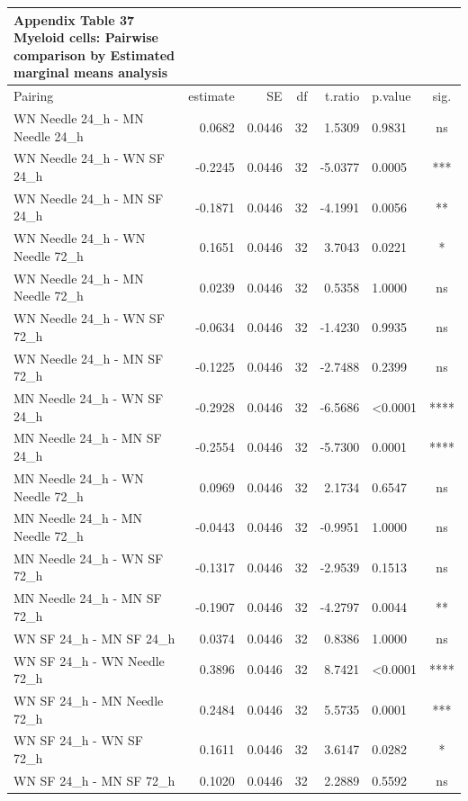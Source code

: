 \documentclass[
  12pt,
  letterpaper,
]{article}
\begin{document}
\begingroup
\fontsize{12.0pt}{14.4pt}\selectfont
\begin{longtable}{l|rrrrlc}
\caption*{
{\large \textbf{Appendix Table 37}} \\ 
{\small \textbf{Myeloid cells: Pairwise comparison by Estimated marginal means analysis}}
} \\ 
\toprule
Pairing & estimate & SE & df & t.ratio & p.value & sig. \\ 
\midrule\addlinespace[2.5pt]
WN Needle 24\_h - MN Needle 24\_h & 0.0682 & 0.0446 & 32 & 1.5309 & 0.9831 & ns \\ 
WN Needle 24\_h - WN SF 24\_h & -0.2245 & 0.0446 & 32 & -5.0377 & 0.0005 & *** \\ 
WN Needle 24\_h - MN SF 24\_h & -0.1871 & 0.0446 & 32 & -4.1991 & 0.0056 & ** \\ 
WN Needle 24\_h - WN Needle 72\_h & 0.1651 & 0.0446 & 32 & 3.7043 & 0.0221 & * \\ 
WN Needle 24\_h - MN Needle 72\_h & 0.0239 & 0.0446 & 32 & 0.5358 & 1.0000 & ns \\ 
WN Needle 24\_h - WN SF 72\_h & -0.0634 & 0.0446 & 32 & -1.4230 & 0.9935 & ns \\ 
WN Needle 24\_h - MN SF 72\_h & -0.1225 & 0.0446 & 32 & -2.7488 & 0.2399 & ns \\ 
MN Needle 24\_h - WN SF 24\_h & -0.2928 & 0.0446 & 32 & -6.5686 & <0.0001 & **** \\ 
MN Needle 24\_h - MN SF 24\_h & -0.2554 & 0.0446 & 32 & -5.7300 & 0.0001 & **** \\ 
MN Needle 24\_h - WN Needle 72\_h & 0.0969 & 0.0446 & 32 & 2.1734 & 0.6547 & ns \\ 
MN Needle 24\_h - MN Needle 72\_h & -0.0443 & 0.0446 & 32 & -0.9951 & 1.0000 & ns \\ 
MN Needle 24\_h - WN SF 72\_h & -0.1317 & 0.0446 & 32 & -2.9539 & 0.1513 & ns \\ 
MN Needle 24\_h - MN SF 72\_h & -0.1907 & 0.0446 & 32 & -4.2797 & 0.0044 & ** \\ 
WN SF 24\_h - MN SF 24\_h & 0.0374 & 0.0446 & 32 & 0.8386 & 1.0000 & ns \\ 
WN SF 24\_h - WN Needle 72\_h & 0.3896 & 0.0446 & 32 & 8.7421 & <0.0001 & **** \\ 
WN SF 24\_h - MN Needle 72\_h & 0.2484 & 0.0446 & 32 & 5.5735 & 0.0001 & *** \\ 
WN SF 24\_h - WN SF 72\_h & 0.1611 & 0.0446 & 32 & 3.6147 & 0.0282 & * \\ 
WN SF 24\_h - MN SF 72\_h & 0.1020 & 0.0446 & 32 & 2.2889 & 0.5592 & ns \\ 

\end{longtable}
\end{document}
